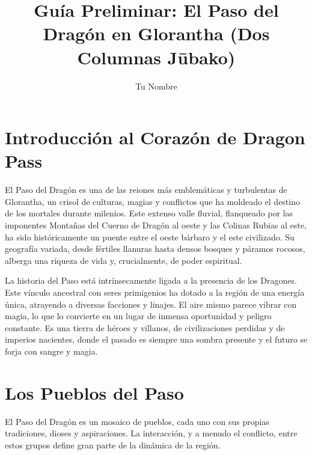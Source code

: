\documentclass[10pt,twocolumn]{book} %
\title{Guía Preliminar: El Paso del Dragón en Glorantha (Dos Columnas Jūbako)}
\author{Tu Nombre}
\date{} %
\begin{document}
\maketitle

\section{Introducción al Corazón de Dragon Pass}

El Paso del Dragón es una de las reiones más emblemáticas y turbulentas de Glorantha, un crisol de culturas, magias y conflictos que ha moldeado el destino de los mortales durante milenios. Este extenso valle fluvial, flanqueado por las imponentes Montañas del Cuerno de Dragón al oeste y las Colinas Rubias al este, ha sido históricamente un puente entre el oeste bárbaro y el este civilizado. Su geografía variada, desde fértiles llanuras hasta densos bosques y páramos rocosos, alberga una riqueza de vida y, crucialmente, de poder espiritual.

La historia del Paso está intrínsecamente ligada a la presencia de los Dragones. Este vínculo ancestral con seres primigenios ha dotado a la región de una energía única, atrayendo a diversas facciones y linajes. El aire mismo parece vibrar con magia, lo que lo convierte en un lugar de inmensa oportunidad y peligro constante. Es una tierra de héroes y villanos, de civilizaciones perdidas y de imperios nacientes, donde el pasado es siempre una sombra presente y el futuro se forja con sangre y magia.


\section{Los Pueblos del Paso}

El Paso del Dragón es un mosaico de pueblos, cada uno con sus propias tradiciones, dioses y aspiraciones. La interacción, y a menudo el conflicto, entre estos grupos define gran parte de la dinámica de la región.
\end{document}

